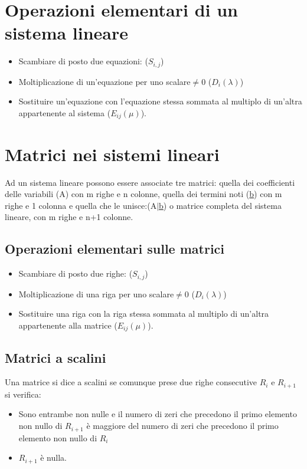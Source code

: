 \section{Operazioni elementari di un sistema lineare}
\begin{itemize}
\item Scambiare di posto due equazioni: ($S_{i,j}$)
\item Moltiplicazione di un'equazione per uno scalare$\neq 0$ ($D_i(\lambda)$)
\item Sostituire un'equazione con l'equazione stessa sommata al multiplo di un'altra appartenente al sistema ($E_{ij}(\mu)$).  
\end{itemize}
\section{Matrici nei sistemi lineari}
Ad un sistema lineare possono essere associate tre matrici: quella dei coefficienti delle variabili (A) con m righe e n colonne, quella dei termini noti (\underline{b}) con m 
righe e 1 colonna e quella che le unisce:(A$|$\underline{b}) o matrice completa del sistema lineare, con m righe e n+1 colonne.
\subsection{Operazioni elementari sulle matrici}
\begin{itemize}
\item Scambiare di posto due righe: ($S_{i,j}$)
\item Moltiplicazione di una riga per uno scalare$\neq 0$ ($D_i(\lambda)$)
\item Sostituire una riga con la riga stessa sommata al multiplo di un'altra appartenente alla matrice ($E_{ij}(\mu)$). 
\end{itemize}
\subsection{Matrici a scalini}
Una matrice si dice a scalini se comunque prese due righe consecutive $R_i$ e $R_{i+1}$ si verifica:
\begin{itemize}
\item Sono entrambe non nulle e il numero di zeri che precedono il primo elemento non nullo di $R_{i+1}$ \`e maggiore del numero di zeri che precedono il primo elemento non 
nullo di $R_{i}$
\item $R_{i+1}$ \`e nulla.
\end{itemize}
